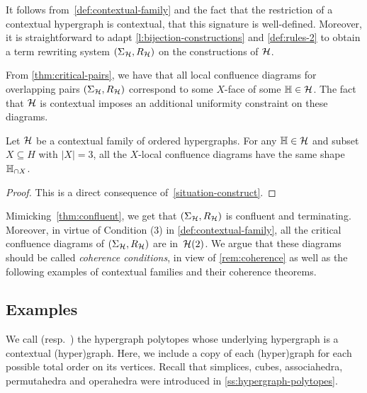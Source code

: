 It follows from~\cref{def:contextual-family} and the fact that the restriction of a contextual hypergraph is contextual, that this signature is well-defined.
Moreover, it is straightforward to adapt \cref{l:bijection-constructions} and \cref{def:rules-2} to obtain a term rewriting system $(\Sigma_{\mathcal{H}},R_{\mathcal{H}})$ on the constructions of $\mathcal{H}$. 

From \cref{thm:critical-pairs}, we have that all local confluence diagrams for overlapping pairs $(\Sigma_{\mathcal{H}},R_{\mathcal{H}})$ correspond to some $X$-face of some ${\mathbb H} \in \mathcal{H}$.
The fact that $\mathcal{H}$ is contextual imposes an additional uniformity constraint on these diagrams.

\begin{thm} [A DISCUTER]
Let $\mathcal{H}$ be a contextual family of ordered hypergraphs.
For any ${\mathbb H} \in \mathcal{H}$ and subset $X \subseteq H$ with $|X|=3$, all the $X$-local confluence diagrams have the same shape ${\mathbb H}_{\cap X}$. 
\end{thm}

\begin{proof} 
This is a direct consequence of~\cref{situation-construct}.
\end{proof}

Mimicking~\cref{thm:confluent}, we get that $(\Sigma_{\mathcal{H}},R_{\mathcal{H}})$ is confluent and terminating.
Moreover, in virtue of Condition (3) in \cref{def:contextual-family}, all the critical confluence diagrams of $(\Sigma_{\mathcal{H}},R_{\mathcal{H}})$ are in~$\mathcal{H}(2)$.
We argue that these diagrams should be called \emph{coherence conditions}, in view of \cref{rem:coherence} as well as the following examples of contextual families and their coherence theorems. 


\subsection{Examples}
\label{ss:examples}

We call  (resp.\ ) the hypergraph polytopes whose underlying hypergraph is a contextual (hyper)graph.
Here, we include a copy of each (hyper)graph for each possible total order on its vertices.
Recall that simplices, cubes, associahedra, permutahedra and operahedra were introduced in \cref{ss:hypergraph-polytopes}.

